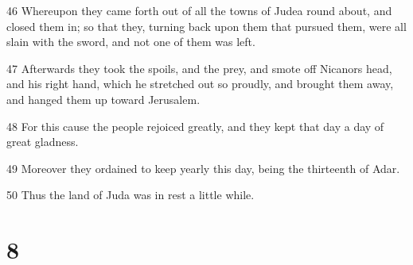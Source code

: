 \par 46 Whereupon they came forth out of all the towns of Judea round about, and closed them in; so that they, turning back upon them that pursued them, were all slain with the sword, and not one of them was left.
\par 47 Afterwards they took the spoils, and the prey, and smote off Nicanors head, and his right hand, which he stretched out so proudly, and brought them away, and hanged them up toward Jerusalem.
\par 48 For this cause the people rejoiced greatly, and they kept that day a day of great gladness.
\par 49 Moreover they ordained to keep yearly this day, being the thirteenth of Adar.
\par 50 Thus the land of Juda was in rest a little while.

\chapter{8}

